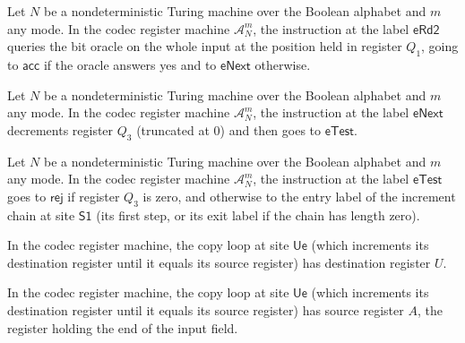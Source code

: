 \begin{lemma}
\label{Complexity.Codec.CA_eRd2}
\leanok
{}
Let $N$ be a nondeterministic Turing machine over the Boolean alphabet and $m$ any mode.
In the codec register machine $\mathcal{A}^m_N$, the instruction at the label
$\mathsf{eRd2}$ queries the bit oracle on the whole input at the position held in
register $Q_1$, going to $\mathsf{acc}$ if the oracle answers yes and to
$\mathsf{eNext}$ otherwise.
\end{lemma}

\begin{lemma}
\label{Complexity.Codec.CA_eNext}
\leanok
{}
Let $N$ be a nondeterministic Turing machine over the Boolean alphabet and $m$ any mode.
In the codec register machine $\mathcal{A}^m_N$, the instruction at the label
$\mathsf{eNext}$ decrements register $Q_3$ (truncated at $0$) and then goes to
$\mathsf{eTest}$.
\end{lemma}

\begin{lemma}
\label{Complexity.Codec.CA_eTest}
\leanok
{}
Let $N$ be a nondeterministic Turing machine over the Boolean alphabet and $m$ any mode.
In the codec register machine $\mathcal{A}^m_N$, the instruction at the label
$\mathsf{eTest}$ goes to $\mathsf{rej}$ if register $Q_3$ is zero, and otherwise to the
entry label of the increment chain at site $\mathsf{S1}$ (its first step, or its exit
label if the chain has length zero).
\end{lemma}

\begin{lemma}
\label{Complexity.Codec.cpDst_Ue}
\leanok
{}
In the codec register machine, the copy loop at site $\mathsf{Ue}$ (which increments its
destination register until it equals its source register) has destination register $U$.
\end{lemma}

\begin{lemma}
\label{Complexity.Codec.cpSrc_Ue}
\leanok
{}
In the codec register machine, the copy loop at site $\mathsf{Ue}$ (which increments its
destination register until it equals its source register) has source register $A$, the
register holding the end of the input field.
\end{lemma}

